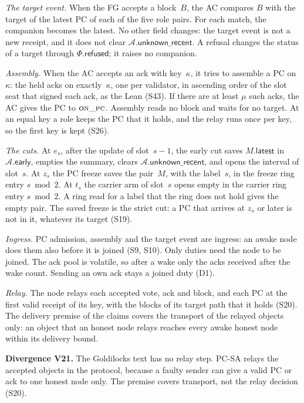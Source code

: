 \documentclass{article}
\newcommand{\AC}{\mathcal A}
\newcommand{\Fr}{\Phi}
\newcommand{\PCdiv}[2]{\par\noindent\textbf{Divergence #1.} #2\par}
\begin{document}
\emph{The target event.}  When the FG accepts a block~$B$, the AC compares
$B$ with the target of the latest PC of each of the five role pairs.  For
each match, the companion becomes the latest.  No other field changes:
the target event is not a new receipt, and it does not clear
$\AC.\mathsf{unknown\_recent}$.  A refusal changes the status of a target
through $\Fr.\mathsf{refused}$; it raises no companion.

\emph{Assembly.}  When the AC accepts an ack with key~$\kappa$, it tries to
assemble a PC on~$\kappa$: the held acks on exactly~$\kappa$, one per
validator, in ascending order of the slot seat that signed each ack, as
the Lean (S43).  If there are at least $\mu$
such acks, the AC gives the PC to $\Call{on\_pc}{}$.  Assembly reads no
block and waits for no target.  At an equal key a role keeps the PC that
it holds, and the relay runs once per key, so the first key is kept
(S26).

\emph{The cuts.}  At $e_s$, after the update of slot~$s-1$, the early cut
saves $M.\mathsf{latest}$ in $\AC.\mathsf{early}$, empties the summary,
clears $\AC.\mathsf{unknown\_recent}$, and opens the interval of slot~$s$.
At $z_s$ the PC freeze saves the pair~$M$, with the label~$s$, in the
freeze ring entry $s\bmod2$.  At $t_s$ the carrier arm of slot~$s$ opens
empty in the carrier ring entry $s\bmod2$.  A ring read for a label that
the ring does not hold gives the empty pair.  The saved freeze is the
strict cut: a PC that arrives at $z_s$ or later is not in it, whatever its
target (S19).

\emph{Ingress.}  PC admission, assembly and the target event are ingress:
an awake node does them also before it is joined (S9, S10).  Only duties
need the node to be joined.  The ack pool is volatile, so after a wake
only the acks received after the wake count.  Sending an own ack stays a
joined duty (D1).

\emph{Relay.}  The node relays each accepted vote, ack and block, and each
PC at the first valid receipt of its key, with the blocks of its target
path that it holds (S20).  The delivery premise of the claims covers the
transport of the relayed objects only: an object that an honest node
relays reaches every awake honest node within its delivery bound.

\PCdiv{V21}{The Goldilocks text has no relay step.  PC-SA relays the
accepted objects in the protocol, because a faulty sender can give a valid
PC or ack to one honest node only.  The premise covers transport, not the
relay decision (S20).}
\end{document}
